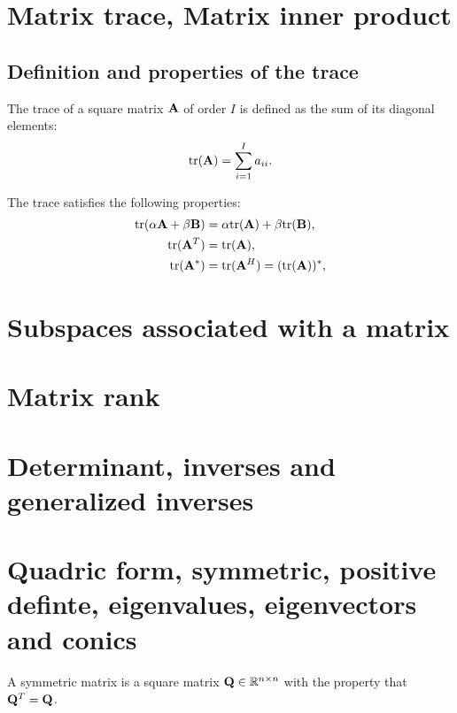 \section{Matrix trace, Matrix inner product}

\subsection{Definition and properties of the trace}
\begin{definition}{}{}
    The trace of a square matrix $\bold{A}$ of order $I$ is defined as the sum of its diagonal elements:
    \begin{align*}
        \text{tr}(\bold{A})=\sum\limits_{i=1}^{I}a_{ii}.
    \end{align*}
\end{definition}

\begin{proposition}{}{}
    The trace satisfies the following properties:
    \begin{align*}
        \text{tr}(\alpha \bold{A}+\beta \bold{B}) &= \alpha \text{tr}(\bold{A}) + \beta \text{tr}(\bold{B}),\\
        \text{tr}(\bold{A}^T)&=\text{tr}(\bold{A}),\\
        \text{tr}(\bold{A}^*)&=\text{tr}(\bold{A}^H)=(\text{tr}(\bold{A}))^*,\\
    \end{align*}
\end{proposition}

\section{Subspaces associated with a matrix}

\section{Matrix rank}

\section{Determinant, inverses and generalized inverses}

\section{Quadric form, symmetric, positive definte, eigenvalues, eigenvectors and conics}
\begin{definition}{}{}
    A symmetric matrix is a square matrix $\bold{Q}\in\mathbb{R}^{n\times n}$ with the property that $\bold{Q}^T=\bold{Q}$.
\end{definition}

